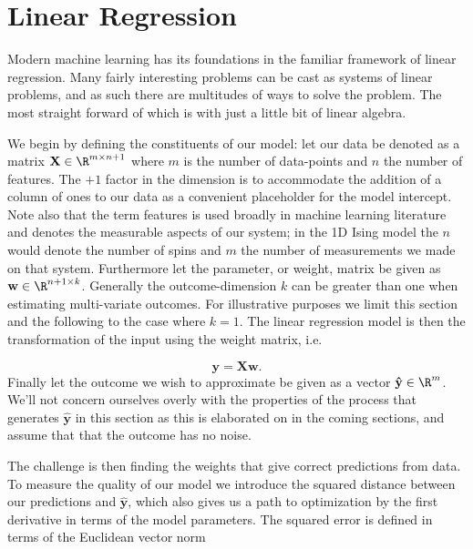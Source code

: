
\section{Linear Regression}\label{sec:LinReg}

Modern machine learning has its foundations in the familiar framework of linear regression. Many fairly interesting problems can be cast as systems of linear problems, and as such there are multitudes of ways to solve the problem. The most straight forward of which is with just a little bit of linear algebra.

We begin by defining the constituents of our model: let our data be denoted as a matrix $\mathbf{X} \in \R^{m\times n+1}$ where $m$ is the number of data-points and $n$ the number of features. The $+1$ factor in the dimension is to accommodate the addition of a column of ones to our data as a convenient placeholder for the model intercept. Note also that the term features is used broadly in machine learning literature and denotes the measurable aspects of our system; in the 1D Ising model the $n$ would denote the number of spins and $m$ the number of measurements we made on that system. Furthermore let the parameter, or weight, matrix be given as $\mathbf{w} \in \R^{n + 1\times k}$. Generally the outcome-dimension $k$ can be greater than one when estimating multi-variate outcomes. For illustrative purposes we limit this section and the following to the case where $k=1$. The linear regression model is then the transformation of the input using the weight matrix, i.e. 

\begin{equation}\label{eq:og_linreg}
\mathbf{y} = \mathbf{X}\mathbf{w}.
\end{equation}
\noindent Finally let the outcome we wish to approximate be given as a vector $\mathbf{\hat{y}} \in \R^m$. We'll not concern ourselves overly with the properties of the process that generates $\mathbf{\hat{y}}$ in this section as this is elaborated on in the coming sections, and assume that that the outcome has no noise.

The challenge is then finding the weights that give correct predictions from data. To measure the quality of our model we introduce the squared distance between our predictions and $\mathbf{\hat{y}}$, which also gives us a path to optimization by the first derivative in terms of the model parameters. The squared error is defined in terms of the Euclidean vector norm  

